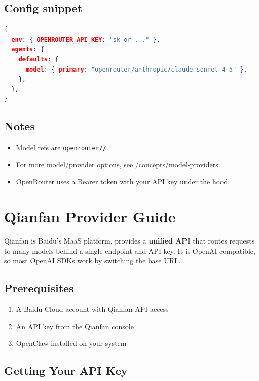 \subsection{Config snippet}


\begin{lstlisting}[language=json]
{
  env: { OPENROUTER_API_KEY: "sk-or-..." },
  agents: {
    defaults: {
      model: { primary: "openrouter/anthropic/claude-sonnet-4-5" },
    },
  },
}
\end{lstlisting}


\subsection{Notes}


\begin{itemize}
  \item Model refs are \texttt{openrouter//}.
  \item For more model/provider options, see \href{/concepts/model-providers}{/concepts/model-providers}.
  \item OpenRouter uses a Bearer token with your API key under the hood.
\end{itemize}



\clearpage

\section{Qianfan Provider Guide}


Qianfan is Baidu's MaaS platform, provides a \textbf{unified API} that routes requests to many models behind a single
endpoint and API key. It is OpenAI-compatible, so most OpenAI SDKs work by switching the base URL.

\subsection{Prerequisites}


\begin{enumerate}
  \item A Baidu Cloud account with Qianfan API access
  \item An API key from the Qianfan console
  \item OpenClaw installed on your system
\end{enumerate}


\subsection{Getting Your API Key}


